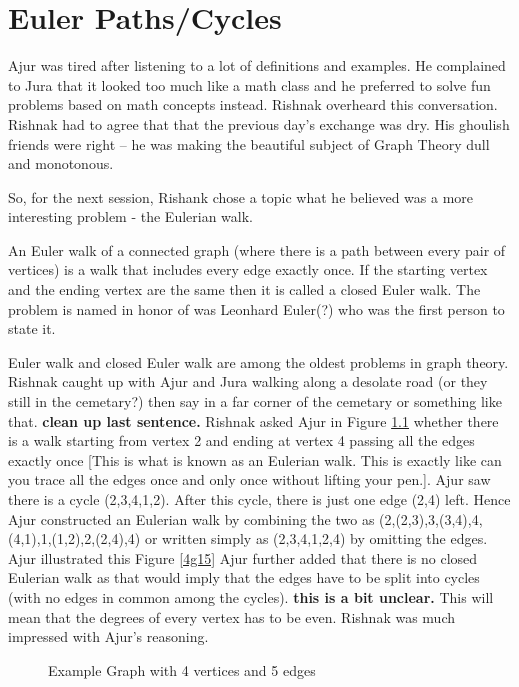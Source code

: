 \chapter{Euler Paths/Cycles}

Ajur was tired after listening to a lot of definitions and examples. He complained to Jura that it looked too much like a math class and he preferred to solve fun problems based on math concepts instead.  Rishnak overheard this conversation. Rishnak had to agree that that the previous day's exchange was dry. His ghoulish friends were right -- he was making the beautiful subject of Graph Theory dull and monotonous.

So, for the next session, Rishank chose a topic what he believed was a more interesting problem - the Eulerian walk. 

An Euler walk of a connected graph (where there is a path between every pair of vertices) is a walk that includes every edge exactly once. If the starting vertex and the ending vertex are the same then it is called a closed Euler walk. The problem is named in honor of was Leonhard Euler(?) who was the first person to state it.

 Euler walk and closed Euler walk are among the oldest problems in graph theory. Rishnak caught up with Ajur and Jura walking along a desolate road (or they still in the cemetary?) then say in a far corner of the cemetary or something like that. \textbf{clean up last sentence.} Rishnak asked Ajur in  Figure \ref{4g1} whether there is a walk starting from vertex 2 and ending at vertex 4 passing all the edges exactly once [This is what is known as an Eulerian walk. This is exactly like can you trace all the edges once and only once without lifting your pen.]. Ajur saw there is a cycle (2,3,4,1,2). After this cycle, there is just one edge (2,4) left. Hence Ajur constructed an Eulerian walk by combining the two as (2,(2,3),3,(3,4),4,(4,1),1,(1,2),2,(2,4),4) or written simply as (2,3,4,1,2,4) by omitting the edges. Ajur illustrated this Figure \ref{4g15} Ajur further added that there is no closed Eulerian walk as that would imply that the edges have to be split into cycles (with no edges in common among the cycles). \textbf{this is a bit unclear.} This will mean that the degrees of every vertex has to be even. Rishnak was much impressed with Ajur's reasoning. 


\begin{figure}
\begin{center}
\caption{ Example Graph with 4 vertices and 5 edges}\label{4g1}
\end{center}
\end{figure}

